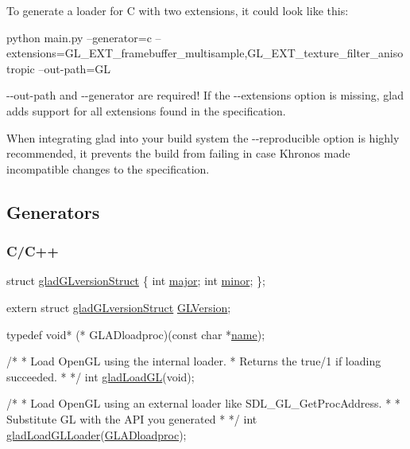 To generate a loader for C with two extensions, it could look like this\+: \begin{DoxyVerb}python main.py --generator=c --extensions=GL_EXT_framebuffer_multisample,GL_EXT_texture_filter_anisotropic --out-path=GL
\end{DoxyVerb}


{\ttfamily -\/-\/out-\/path} and {\ttfamily -\/-\/generator} are required! If the {\ttfamily -\/-\/extensions} option is missing, glad adds support for all extensions found in the specification.

When integrating glad into your build system the {\ttfamily -\/-\/reproducible} option is highly recommended, it prevents the build from failing in case Khronos made incompatible changes to the specification.

\subsection*{Generators}

\subsubsection*{C/\+C++}


\begin{DoxyCode}
\textcolor{keyword}{struct }\mbox{\hyperlink{structgladGLversionStruct}{gladGLversionStruct}} \{
    \textcolor{keywordtype}{int} \mbox{\hyperlink{structgladGLversionStruct_ac7f9db11d2679df12ef0313b728554db}{major}};
    \textcolor{keywordtype}{int} \mbox{\hyperlink{structgladGLversionStruct_acc2bff1c8966c6866f2ad6f5a4e475b2}{minor}};
\};

\textcolor{keyword}{extern} \textcolor{keyword}{struct }\mbox{\hyperlink{structgladGLversionStruct}{gladGLversionStruct}} \mbox{\hyperlink{glad_8h_ae67346f059e05b267a9f972854df2c15}{GLVersion}};

\textcolor{keyword}{typedef} \textcolor{keywordtype}{void}* (* GLADloadproc)(\textcolor{keyword}{const} \textcolor{keywordtype}{char} *\mbox{\hyperlink{glad_8h_aaced7cfc21e7d37775d6921bb8177239}{name}});

\textcolor{comment}{/*}
\textcolor{comment}{ * Load OpenGL using the internal loader.}
\textcolor{comment}{ * Returns the true/1 if loading succeeded.}
\textcolor{comment}{ *}
\textcolor{comment}{ */}
\textcolor{keywordtype}{int} \mbox{\hyperlink{glad_8h_a7e9e0ebe65864f5f2bcd289c5736041b}{gladLoadGL}}(\textcolor{keywordtype}{void});

\textcolor{comment}{/*}
\textcolor{comment}{ * Load OpenGL using an external loader like SDL\_GL\_GetProcAddress.}
\textcolor{comment}{ *}
\textcolor{comment}{ * Substitute GL with the API you generated}
\textcolor{comment}{ *}
\textcolor{comment}{ */}
\textcolor{keywordtype}{int} \mbox{\hyperlink{glad_8h_a1f34fdf1c2f94c05c53d2a1cd3d80537}{gladLoadGLLoader}}(\mbox{\hyperlink{glad_8h_a90ad7e2ab6cd1b09bf0f5b9eebacc8a2}{GLADloadproc}});
\end{DoxyCode}


